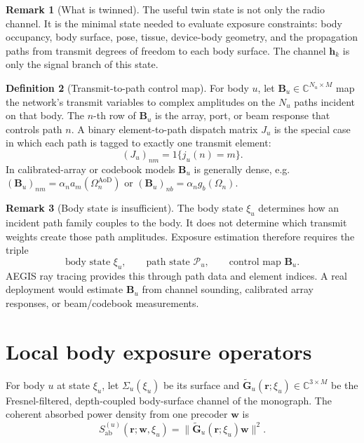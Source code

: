 \documentclass[11pt,a4paper]{article}
\theoremstyle{definition}
\newtheorem{definition}{Definition}[section]
\newtheorem{remark}[definition]{Remark}
\theoremstyle{plain}
\newcommand{\rr}{\mathbf r}
\newcommand{\ww}{\mathbf w}
\newcommand{\hh}{\mathbf h}
\newcommand{\B}{\mathbf B}
\newcommand{\Gtil}{\widetilde{\mathbf G}}
\newcommand{\Complex}{\mathbb C}
\begin{document}
\begin{remark}[What is twinned]
The useful twin state is not only the radio channel.  It is the minimal
state needed to evaluate exposure constraints: body occupancy, body
surface, pose, tissue, device-body geometry, and the propagation paths
from transmit degrees of freedom to each body surface.  The channel
$\hh_k$ is only the signal branch of this state.
\end{remark}

\begin{definition}[Transmit-to-path control map]\label{def:B}
For body $u$, let $\B_u\in\Complex^{N_u\times M}$ map the network's
transmit variables to complex amplitudes on the $N_u$ paths incident on
that body.  The $n$-th row of $\B_u$ is the array, port, or beam response
that controls path $n$.  A binary element-to-path dispatch matrix $J_u$ is
the special case in which each path is tagged to exactly one transmit
element:
\begin{equation}
  (J_u)_{nm}=1\{j_u(n)=m\}.
\end{equation}
In calibrated-array or codebook models $\B_u$ is generally dense, e.g.
$(\B_u)_{nm}=\alpha_n a_m(\Omega^{\mathrm{AoD}}_n)$ or
$(\B_u)_{nb}=\alpha_n g_b(\Omega_n)$.
\end{definition}

\begin{remark}[Body state is insufficient]
The body state $\xi_u$ determines how an incident path family couples to
the body.  It does not determine which transmit weights create those path
amplitudes.  Exposure estimation therefore requires the triple
\[
  \text{body state }\xi_u,\qquad
  \text{path state }\mathcal P_u,\qquad
  \text{control map }\B_u.
\]
AEGIS ray tracing provides this through path data and element indices.  A
real deployment would estimate $\B_u$ from channel sounding, calibrated
array responses, or beam/codebook measurements.
\end{remark}

\section{Local body exposure operators}

For body $u$ at state $\xi_u$, let
$\Sigma_u(\xi_u)$ be its surface and
$\Gtil_u(\rr;\xi_u)\in\Complex^{3\times M}$ be the Fresnel-filtered,
depth-coupled body-surface channel of the monograph.  The coherent
absorbed power density from one precoder $\ww$ is
\begin{equation}
  S_{\mathrm{ab}}^{(u)}(\rr;\ww,\xi_u)=
  \|\Gtil_u(\rr;\xi_u)\ww\|^2.
\end{equation}
\end{document}
